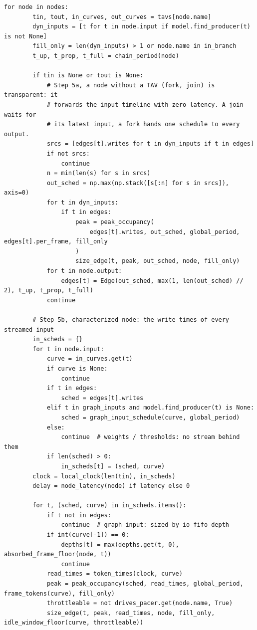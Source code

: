 \documentclass[10pt,a4paper]{article}
\begin{document}
\begin{lstlisting}[firstnumber=934,title={\texttt{src/finn/transformation/fpgadataflow/derive\_characteristic.py}, lines 934--1000}]
    for node in nodes:
        tin, tout, in_curves, out_curves = tavs[node.name]
        dyn_inputs = [t for t in node.input if model.find_producer(t) is not None]
        fill_only = len(dyn_inputs) > 1 or node.name in in_branch
        t_up, t_prop, t_full = chain_period(node)

        if tin is None or tout is None:
            # Step 5a, a node without a TAV (fork, join) is transparent: it
            # forwards the input timeline with zero latency. A join waits for
            # its latest input, a fork hands one schedule to every output.
            srcs = [edges[t].writes for t in dyn_inputs if t in edges]
            if not srcs:
                continue
            n = min(len(s) for s in srcs)
            out_sched = np.max(np.stack([s[:n] for s in srcs]), axis=0)
            for t in dyn_inputs:
                if t in edges:
                    peak = peak_occupancy(
                        edges[t].writes, out_sched, global_period, edges[t].per_frame, fill_only
                    )
                    size_edge(t, peak, out_sched, node, fill_only)
            for t in node.output:
                edges[t] = Edge(out_sched, max(1, len(out_sched) // 2), t_up, t_prop, t_full)
            continue

        # Step 5b, characterized node: the write times of every streamed input
        in_scheds = {}
        for t in node.input:
            curve = in_curves.get(t)
            if curve is None:
                continue
            if t in edges:
                sched = edges[t].writes
            elif t in graph_inputs and model.find_producer(t) is None:
                sched = graph_input_schedule(curve, global_period)
            else:
                continue  # weights / thresholds: no stream behind them
            if len(sched) > 0:
                in_scheds[t] = (sched, curve)
        clock = local_clock(len(tin), in_scheds)
        delay = node_latency(node) if latency else 0

        for t, (sched, curve) in in_scheds.items():
            if t not in edges:
                continue  # graph input: sized by io_fifo_depth
            if int(curve[-1]) == 0:
                depths[t] = max(depths.get(t, 0), absorbed_frame_floor(node, t))
                continue
            read_times = token_times(clock, curve)
            peak = peak_occupancy(sched, read_times, global_period, frame_tokens(curve), fill_only)
            throttleable = not drives_pacer.get(node.name, True)
            size_edge(t, peak, read_times, node, fill_only, idle_window_floor(curve, throttleable))


\end{lstlisting}
\end{document}
